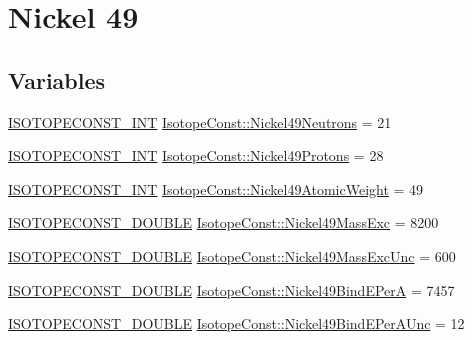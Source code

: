 \hypertarget{group___isotope_const-_nickel-_ni49}{}\section{Nickel 49}
\label{group___isotope_const-_nickel-_ni49}
\subsection*{Variables}
\begin{DoxyCompactItemize}
\item 
\mbox{\hyperlink{group___isotope_const-_macros_ga5f18360b3e99483a35c32d789e62621c}{I\+S\+O\+T\+O\+P\+E\+C\+O\+N\+S\+T\+\_\+\+I\+NT}} \mbox{\hyperlink{group___isotope_const-_nickel-_ni49_ga4e0286220347a4210a7fd13c94529449}{Isotope\+Const\+::\+Nickel49\+Neutrons}} = 21
\item 
\mbox{\hyperlink{group___isotope_const-_macros_ga5f18360b3e99483a35c32d789e62621c}{I\+S\+O\+T\+O\+P\+E\+C\+O\+N\+S\+T\+\_\+\+I\+NT}} \mbox{\hyperlink{group___isotope_const-_nickel-_ni49_ga84618ae03c5a906067f40e990c212358}{Isotope\+Const\+::\+Nickel49\+Protons}} = 28
\item 
\mbox{\hyperlink{group___isotope_const-_macros_ga5f18360b3e99483a35c32d789e62621c}{I\+S\+O\+T\+O\+P\+E\+C\+O\+N\+S\+T\+\_\+\+I\+NT}} \mbox{\hyperlink{group___isotope_const-_nickel-_ni49_ga507f9030e146c004b6ba881bddd7c471}{Isotope\+Const\+::\+Nickel49\+Atomic\+Weight}} = 49
\item 
\mbox{\hyperlink{group___isotope_const-_macros_ga8f45a7272ce02c0b4c65c44636ed719a}{I\+S\+O\+T\+O\+P\+E\+C\+O\+N\+S\+T\+\_\+\+D\+O\+U\+B\+LE}} \mbox{\hyperlink{group___isotope_const-_nickel-_ni49_ga0738ff2c68b95fec72cd92c357043b65}{Isotope\+Const\+::\+Nickel49\+Mass\+Exc}} = 8200
\item 
\mbox{\hyperlink{group___isotope_const-_macros_ga8f45a7272ce02c0b4c65c44636ed719a}{I\+S\+O\+T\+O\+P\+E\+C\+O\+N\+S\+T\+\_\+\+D\+O\+U\+B\+LE}} \mbox{\hyperlink{group___isotope_const-_nickel-_ni49_gabd719c28edbe1b51afbbf140b4b3e004}{Isotope\+Const\+::\+Nickel49\+Mass\+Exc\+Unc}} = 600
\item 
\mbox{\hyperlink{group___isotope_const-_macros_ga8f45a7272ce02c0b4c65c44636ed719a}{I\+S\+O\+T\+O\+P\+E\+C\+O\+N\+S\+T\+\_\+\+D\+O\+U\+B\+LE}} \mbox{\hyperlink{group___isotope_const-_nickel-_ni49_gad529200e6d98ed53ddbf889470212574}{Isotope\+Const\+::\+Nickel49\+Bind\+E\+PerA}} = 7457
\item 
\mbox{\hyperlink{group___isotope_const-_macros_ga8f45a7272ce02c0b4c65c44636ed719a}{I\+S\+O\+T\+O\+P\+E\+C\+O\+N\+S\+T\+\_\+\+D\+O\+U\+B\+LE}} \mbox{\hyperlink{group___isotope_const-_nickel-_ni49_ga53a9f382a3486bf644f4715e68c6ef0f}{Isotope\+Const\+::\+Nickel49\+Bind\+E\+Per\+A\+Unc}} = 12

\end{DoxyCompactItemize}
